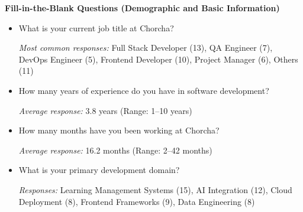 \documentclass[12pt,a4paper,oneside]{book}
\begin{document}
\textbf{Fill-in-the-Blank Questions (Demographic and Basic Information)}\\
\begin{itemize}
  \item What is your current job title at Chorcha?
  
  \textit{Most common responses:} Full Stack Developer (13), QA Engineer (7), DevOps Engineer (5), Frontend Developer (10), Project Manager (6), Others (11)

  \item How many years of experience do you have in software development?
  
  \textit{Average response:} 3.8 years (Range: 1–10 years)

  \item How many months have you been working at Chorcha?
  
  \textit{Average response:} 16.2 months (Range: 2–42 months)

  \item What is your primary development domain?
  
  \textit{Responses:} Learning Management Systems (15), AI Integration (12), Cloud Deployment (8), Frontend Frameworks (9), Data Engineering (8)\\
\end{itemize}
\end{document}
